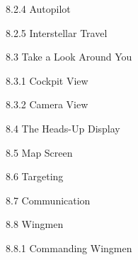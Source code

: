 \documentclass{article}
\begin{document}
8.2.4 Autopilot   



8.2.5 Interstellar Travel  



8.3 Take a Look Around You  



8.3.1 Cockpit View   



8.3.2 Camera View  



8.4 The Heads-Up Display   



8.5 Map Screen   



8.6 Targeting  



8.7 Communication 



8.8 Wingmen  



8.8.1 Commanding Wingmen   
\end{document}

